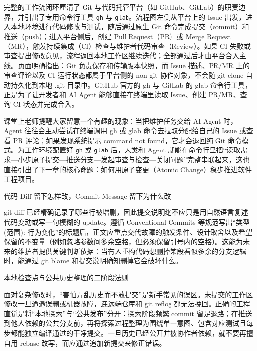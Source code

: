 \documentclass[UTF8,a4paper,11pt,fontset=fandol]{ctexart}
\begin{document}
完整的工作流闭环厘清了 Git 与代码托管平台（如 GitHub、GitLab）的职责边界，并引出了专用命令行工具 \texttt{gh} 与 \texttt{glab}。流程图左侧从平台上的 Issue 出发，进入本地环境进行代码修改与测试，随后通过原生 Git 命令完成提交（commit）和推送（push）；进入平台侧后，创建 Pull Request（PR）或 Merge Request（MR），触发持续集成（CI）检查与维护者代码审查（Review）。如果 CI 失败或审查提出修改意见，流程返回本地工作区继续迭代；全部通过后才由平台合入主线。页面明确指出：Git 负责保存和传输版本快照，而 Issue 描述、PR/MR 上的审查评论以及 CI 运行状态都属于平台侧的 non-git 协作对象，不会随 git clone 自动持久化到本地 .git 目录中。GitHub 官方的 gh 与 GitLab 的 glab 命令行工具，正是为了让开发者和 AI Agent 能够直接在终端里读取 Issue、创建 PR/MR、查询 CI 状态并完成合入。

课堂上老师提醒大家留意一个有趣的现象：当把维护任务交给 AI Agent 时，Agent 往往会主动尝试在终端调用 gh 或 glab 命令去拉取分配给自己的 Issue 或查看 PR 评论；如果发现系统提示 command not found，它才会退回纯 Git 命令模式。为工作环境配置好 \texttt{gh} 或 \texttt{glab} 后，人类和 Agent 就能在命令行里把“读取需求—小步原子提交—推送分支—发起审查与检查—关闭问题”完整串联起来，这也直接引出了下一章的核心命题：如何用原子变更（Atomic Change）稳步推进软件工程项目。

\begin{importantbox}{代码 Diff 留下怎样改，Commit Message 留下为什么改}

git diff 已经精确记录了哪些行被增删，因此提交说明绝不应只是用自然语言复述代码变动或写一句模糊的 update。遵循 Conventional Commits 等规范写出“类型(范围): 行为变化”的标题后，正文应重点交代故障的触发条件、设计取舍以及希望保留的不变量（例如忽略参数间多余空格，但必须保留引号内的空格）。这能为未来的维护者提供关键判断依据：当有人重构代码想删掉某段看似多余的分支逻辑时，能通过 git blame 和提交说明确知删掉它会破坏什么。

\end{importantbox}

\begin{knowledgebox}{本地检查点与公共历史整理的二阶段法则}

面对复杂修改时，“害怕弄乱历史而不敢提交”是新手常见的误区。未提交的工作区修改一旦遭遇误删或机器故障，连远端仓库和 git reflog 都无法挽回。正确的工程直觉是将“本地探索”与“公共发布”分开：探索阶段频繁 commit 留足退路；在推送到他人依赖的公共分支前，再将探索过程整理为围绕单一意图、包含对应测试且每步都能独立编译通过的干净提交。一旦历史已经公开并被协作者依赖，就不要再擅自用 rebase 改写，而应通过追加新提交来修正错误。

\end{knowledgebox}
\end{document}
